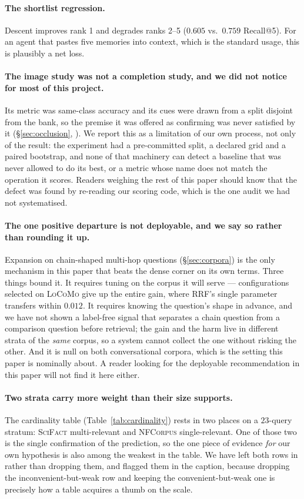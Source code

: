 \paragraph{The shortlist regression.} Descent improves rank 1 and degrades ranks 2--5
($0.605$ vs.\ $0.759$ Recall@5). For an agent that pastes five memories into context, which
is the standard usage, this is plausibly a net loss.

\paragraph{The image study was not a completion study, and we did not notice for most of
this project.} Its metric was same-class accuracy and its cues were drawn from a split
disjoint from the bank, so the premise it was offered as confirming was never satisfied by
it (\S\ref{sec:occlusion}, ). We report this as a limitation of our own process,
not only of the result: the experiment had a pre-committed split, a declared grid and a
paired bootstrap, and none of that machinery can detect a baseline that was never allowed
to do its best, or a metric whose name does not match the operation it scores. Readers
weighing the rest of this paper should know that the defect was found by re-reading our
scoring code, which is the one audit we had not systematised.

\paragraph{The one positive departure is not deployable, and we say so rather than rounding
it up.} Expansion on chain-shaped multi-hop questions (\S\ref{sec:corpora}) is the only
mechanism in this paper that beats the dense corner on its own terms. Three things bound it.
It requires tuning on the corpus it will serve --- configurations selected on
\textsc{LoCoMo} give up the entire gain, where RRF's single parameter transfers within
$0.012$. It requires knowing the question's shape in advance, and we have not shown a
label-free signal that separates a chain question from a comparison question before
retrieval; the gain and the harm live in different strata of the \emph{same} corpus, so a
system cannot collect the one without risking the other. And it is null on both
conversational corpora, which is the setting this paper is nominally about. A reader looking
for the deployable recommendation in this paper will not find it here either.

\paragraph{Two strata carry more weight than their size supports.} The cardinality table
(Table~\ref{tab:cardinality}) rests in two places on a $23$-query stratum: \textsc{SciFact}
multi-relevant and \textsc{NFCorpus} single-relevant. One of those two is the single
confirmation of the prediction, so the one piece of evidence \emph{for} our own hypothesis
is also among the weakest in the table. We have left both rows in rather than dropping them,
and flagged them in the caption, because dropping the inconvenient-but-weak row and keeping
the convenient-but-weak one is precisely how a table acquires a thumb on the scale.

